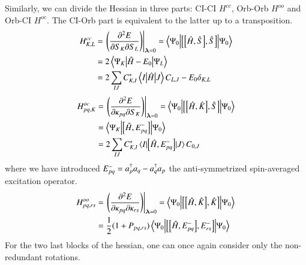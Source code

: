 \documentclass[aip,jcp,reprint,noshowkeys,superscriptaddress]{revtex4-1}
\begin{document}
Similarly, we can divide the Hessian in three parts: CI-CI $H^{cc}$, Orb-Orb $H^{oo}$ and Orb-CI $H^{oc}$. The CI-Orb part is equivalent to the latter up to a transposition.
\begin{align}
  \label{eq:CASSCF_CICI_Hessian}
  H^{cc}_{K,L} &= \eval{\mleft(\pdv{E}{S_{K}}{S_{L}}\mright)}_{\bm{\lambda}=0} = \mel**{\Psi_0}{\com{\com{\hH}{\hS}}{\hS}}{\Psi_0} \\
  &= 2\mel**{\Psi_K}{\hH - E_0}{\Psi_L} \notag \\
  &= 2\sum_{IJ}C_{K,I}^*\mel**{I}{\hH}{J}C_{L,J} - E_0\delta_{K,L} \notag
\end{align}
\begin{align}
  \label{eq:CASSCF_OrbCI_Hessian}
  H^{oc}_{pq,K} &= \eval{\mleft(\pdv{E}{\kappa_{pq}}{S_{K}}\mright)}_{\bm{\lambda}=0} = \mel**{\Psi_0}{\com{\com{\hH}{\hK}}{\hS}}{\Psi_0} \\
                &= \mel**{\Psi_K}{\com{\hH}{E_{pq}^-}}{\Psi_0} \notag \\
                &= 2\sum_{IJ}C_{K,I}^*\mel{I}{\com{\hH}{E_{pq}^-}}{J}C_{0,J} \notag
\end{align}
where we have introduced $E_{pq}^- = a_{p}^\dagger a_{q} - a_{q}^\dagger a_{p}$ the anti-symmetrized spin-averaged excitation operator.
\begin{align}
  \label{eq:MCSCF_SO_OrbOrb_Hessian}
  H^{oo}_{pq,rs} &= \eval{\mleft(\pdv{E}{\kappa_{pq}}{\kappa_{rs}}\mright)}_{\bm{\lambda}=0} = \mel**{\Psi_0}{\com{\com{\hH}{\hK}}{\hK}}{\Psi_0} \\
                   &= \frac{1}{2}(1+P_{pq,rs})\mel**{\Psi_0}{\com{\com{\hH}{E_{pq}^-}}{E_{rs}^-}}{\Psi_0} \notag
\end{align}
For the two last blocks of the hessian, one can once again consider only the non-redundant rotations.
\end{document}
